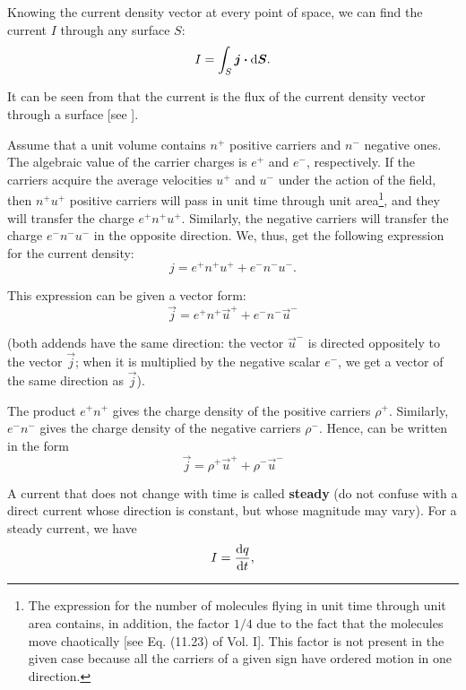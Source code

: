 Knowing the current density vector at every point of space, we can find the current $I$ through any surface $S$:
\begin{equation}\label{eq:5_3}
    I = \int_S \boldsymbol{j} \boldsymbol{\cdot} \mathrm{d}\boldsymbol{S}.
\end{equation}

\noindent
It can be seen from  that the current is the flux of the current density vector through a surface [see ].

Assume that a unit volume contains $n^+$ positive carriers and $n^-$ negative ones. The algebraic value of the carrier charges is $e^+$ and $e^-$, respectively. If the carriers acquire the average velocities $u^+$ and $u^-$ under the action of the field, then $n^+u^+$ positive carriers will pass in unit time through unit area\footnote{The expression for the number of molecules flying in unit time through unit area contains, in addition, the factor $1/4$ due to the fact that the molecules move chaotically [see Eq. (11.23) of Vol. I]. This factor is not present in the given case because all the carriers of a given sign have ordered motion in one direction.}, and they will transfer the charge $e^+n^+u^+$. Similarly, the negative carriers will transfer the charge $e^-n^-u^-$ in the opposite direction. We, thus, get the following expression for the current density:
\begin{equation}\label{eq:5_4}
    j = e^+n^+u^+ + e^-n^-u^-.
\end{equation}

\noindent
This expression can be given a vector form:
\begin{equation}\label{eq:5_5}
    \vec{j} = e^+ n^+ \vec{u}^+ + e^- n^- \vec{u}^-
\end{equation}

\noindent
(both addends have the same direction: the vector $\vec{u}^-$ is directed oppositely to the vector $\vec{j}$; when it is multiplied by the negative scalar $e^-$, we get a vector of the same direction as $\vec{j}$).

The product $e^+n^+$ gives the charge density of the positive carriers $\rho^+$. Similarly, $e^-n^-$ gives the charge density of the negative carriers $\rho^-$. Hence,  can be written in the form
\begin{equation}\label{eq:5_6}
    \vec{j} = \rho^+ \vec{u}^+ + \rho^- \vec{u}^-
\end{equation}

A current that does not change with time is called \textbf{steady} (do not confuse with a direct current whose direction is constant, but whose magnitude may vary). For a steady current, we have
\begin{equation}\label{eq:5_7}
    I = \dfrac{\mathrm{d} q}{\mathrm{d} t},
\end{equation}

